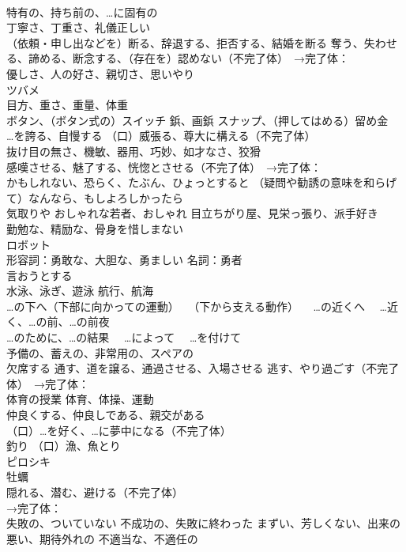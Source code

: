 \documentclass[8pt]{extreport}
\begin{document}
\begin{CJK}{UTF8}{min}
\\	特有の、持ち前の、…に固有の
\\	丁寧さ、丁重さ、礼儀正しい
\\	（依頼・申し出などを）断る、辞退する、拒否する、結婚を断る 奪う、失わせる、諦める、断念する、（存在を）認めない（不完了体）　→完了体：
\\	優しさ、人の好さ、親切さ、思いやり
\\	ツバメ
\\	目方、重さ、重量、体重
\\	ボタン、（ボタン式の）スイッチ 鋲、画鋲 スナップ、（押してはめる）留め金
\\	…を誇る、自慢する （口）威張る、尊大に構える（不完了体） 
\\	抜け目の無さ、機敏、器用、巧妙、如才なさ、狡猾
\\	感嘆させる、魅了する、恍惚とさせる（不完了体）　→完了体：
\\	かもしれない、恐らく、たぶん、ひょっとすると （疑問や勧誘の意味を和らげて）なんなら、もしよろしかったら
\\	気取りや おしゃれな若者、おしゃれ 目立ちがり屋、見栄っ張り、派手好き
\\	勤勉な、精励な、骨身を惜しまない
\\	ロボット
\\	形容詞：勇敢な、大胆な、勇ましい 名詞：勇者
\\	言おうとする
\\	水泳、泳ぎ、遊泳 航行、航海
\\	…の下へ（下部に向かっての運動） 　（下から支える動作） 　…の近くへ 　…近く、…の前、…の前夜 
\\	…のために、…の結果 　…によって 　…を付けて
\\	予備の、蓄えの、非常用の、スペアの
\\	欠席する 通す、道を譲る、通過させる、入場させる 逃す、やり過ごす（不完了体）　→完了体：
\\	体育の授業 体育、体操、運動
\\	仲良くする、仲良しである、親交がある 
\\	（口）…を好く、…に夢中になる（不完了体）
\\	釣り （口）漁、魚とり
\\	ピロシキ
\\	牡蠣
\\	隠れる、潜む、避ける（不完了体） 
\\	→完了体：
\\	失敗の、ついていない 不成功の、失敗に終わった まずい、芳しくない、出来の悪い、期待外れの 不適当な、不適任の

\end{CJK}
\end{document}

